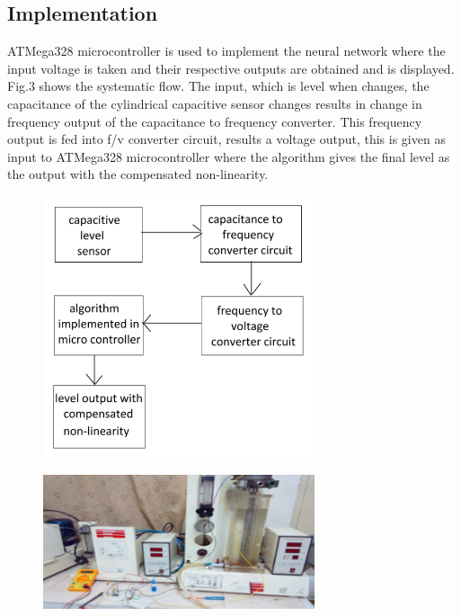 \documentclass[conference]{IEEEtran}
\begin{document}
\subsection{Implementation}
ATMega328 microcontroller is used to implement the neural network where the input voltage is taken and their respective outputs are obtained and is displayed. Fig.3 shows the systematic flow. The input, which is level when changes, the capacitance of the cylindrical capacitive sensor changes results in change in frequency output of the capacitance to frequency converter. This frequency output is fed into f/v converter circuit, results a voltage output, this is given as input to ATMega328 microcontroller where the algorithm gives the final level as the output with the compensated non-linearity. \\
\begin{figure}[h]
\includegraphics[width=8cm]{blockdiagram.png}
\centering
\end{figure}
\begin{figure}[h]
\includegraphics[width=8cm]{setup.png}
\centering
\end{figure}
\end{document}
